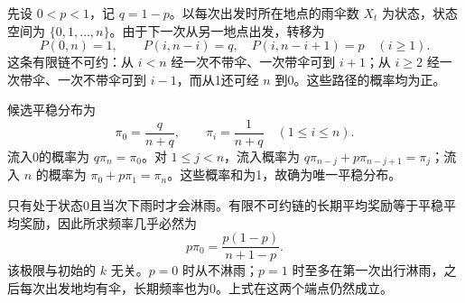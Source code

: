 先设 $0<p<1$，记 $q=1-p$。以每次出发时所在地点的雨伞数 $X_t$ 为状态，状态空间为 $\{0,1,\ldots,n\}$。由于下一次从另一地点出发，转移为
\[
 P(0,n)=1,\qquad
 P(i,n-i)=q,\quad P(i,n-i+1)=p\quad(i\ge1).
\]
这条有限链不可约：从 $i<n$ 经一次不带伞、一次带伞可到 $i+1$；从 $i\ge2$ 经一次带伞、一次不带伞可到 $i-1$，而从1还可经 $n$ 到0。这些路径的概率均为正。

候选平稳分布为
\[
 \pi_0=\frac q{n+q},\qquad
 \pi_i=\frac1{n+q}\quad(1\le i\le n).
\]
流入0的概率为 $q\pi_n=\pi_0$。对 $1\le j<n$，流入概率为 $q\pi_{n-j}+p\pi_{n-j+1}=\pi_j$；流入 $n$ 的概率为 $\pi_0+p\pi_1=\pi_n$。这些概率和为1，故确为唯一平稳分布。

只有处于状态0且当次下雨时才会淋雨。有限不可约链的长期平均奖励等于平稳平均奖励，因此所求频率几乎必然为
\[
 \boxed{p\pi_0=\frac{p(1-p)}{n+1-p}}.
\]
该极限与初始的 $k$ 无关。$p=0$ 时从不淋雨；$p=1$ 时至多在第一次出行淋雨，之后每次出发地均有伞，长期频率也为0。上式在这两个端点仍然成立。
